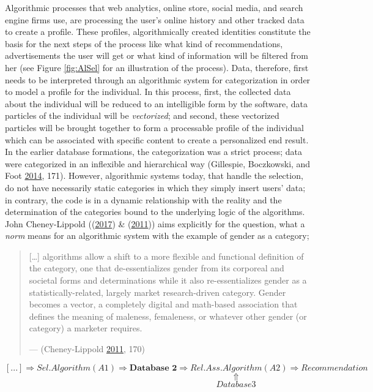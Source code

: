 \documentclass[12pt,twoside]{report}
\begin{document}
Algorithmic processes that web analytics, online store, social media, and search engine firms use, are processing the user's online history and other tracked data to create a profile. These profiles, algorithmically created identities constitute the basis for the next steps of the process like what kind of recommendations, advertisements the user will get or what kind of information will be filtered from her (see Figure \ref{fig:AlSel} for an illustration of the process). Data, therefore, first needs to be interpreted through an algorithmic system for categorization in order to model a profile for the individual. In this process, first, the collected data about the individual will be reduced to an intelligible form by the software, data particles of the individual will be \emph{vectorized}; and second, these vectorized particles will be brought together to form a processable profile of the individual which can be associated with specific content to create a personalized end result. In the earlier database formations, the categorization was a strict process; data were categorized in an inflexible and hierarchical way (Gillespie, Boczkowski, and Foot \protect\hyperlink{ref-Gillespie2014}{2014}, 171). However, algorithmic systems today, that handle the selection, do not have necessarily static categories in which they simply insert users' data; in contrary, the code is in a dynamic relationship with the reality and the determination of the categories bound to the underlying logic of the algorithms. John Cheney-Lippold ((\protect\hyperlink{ref-Cheney2017}{2017}) \& (\protect\hyperlink{ref-Cheney2011}{2011})) aims explicitly for the question, what a \emph{norm} means for an algorithmic system with the example of gender as a category;

\begin{quote}
{[}\ldots{}{]} algorithms allow a shift to a more flexible and functional definition of the category, one that de-essentializes gender from its corporeal and societal forms and determinations while it also re-essentializes gender as a statistically-related, largely market research-driven category. Gender becomes a vector, a completely digital and math-based association that defines the meaning of maleness, femaleness, or whatever other gender (or category) a marketer requires.

--- (Cheney-Lippold \protect\hyperlink{ref-Cheney2011}{2011}, 170)
\end{quote}

\[ [...] \Rightarrow Sel. Algorithm (A1) \Rightarrow  \textbf{Database 2} \Rightarrow Rel. Ass. Algorithm (A2) \Rightarrow Recommendation\]
\[   \qquad \qquad \qquad \qquad \qquad \qquad \qquad \qquad \qquad \Uparrow \]
\[ \qquad \qquad \qquad \qquad \qquad \qquad \qquad \qquad \qquad Database 3 \]
\end{document}
